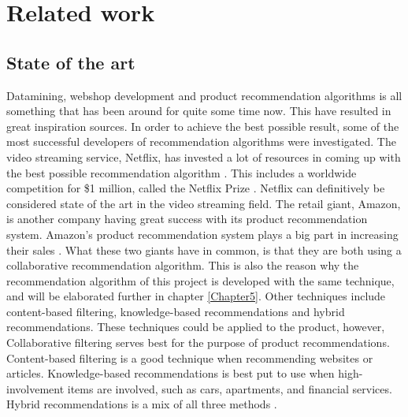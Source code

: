
\chapter{Related work} %

\label{Chapter3} %


\section{State of the art}

Datamining, webshop development and product recommendation algorithms is all something that has been around for quite some time now. This have resulted in great inspiration sources. In order to achieve the best possible result, some of the most successful developers of recommendation algorithms were investigated. The video streaming service, Netflix, has invested a lot of resources in coming up with the best possible recommendation algorithm \cite{Netflix}. This includes a worldwide competition for \$1 million, called the Netflix Prize \cite{NetflixPrize}. Netflix can definitively be considered state of the art in the video streaming field. The retail giant, Amazon, is another company having great success with its product recommendation system. Amazon's product recommendation system plays a big part in increasing their sales \cite{AmazonSuccess}. What these two giants have in common, is that they are both using a collaborative recommendation algorithm. This is also the reason why the recommendation algorithm of this project is developed with the same technique, and will be elaborated further in chapter \ref{Chapter5}. Other techniques include content-based filtering, knowledge-based recommendations and hybrid recommendations. These techniques could be applied to the product, however, Collaborative filtering serves best for the purpose of product recommendations. Content-based filtering is a good technique when recommending websites or articles. Knowledge-based recommendations is best put to use when high-involvement items are involved, such as cars, apartments, and financial services. Hybrid recommendations is a mix of all three methods \cite{recommendationtechniques}.


